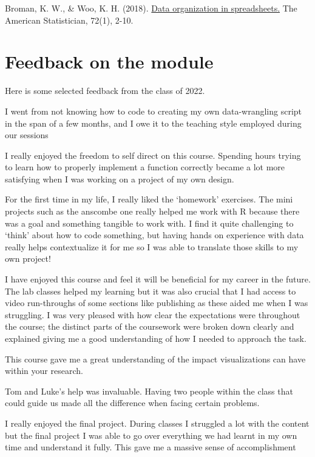 \documentclass[
]{book}
\begin{document}
Broman, K. W., \& Woo, K. H. (2018). \href{https://kbroman.org/dataorg/}{Data organization in spreadsheets.} The American Statistician, 72(1), 2-10.

\hspace{0pt}

\hypertarget{feedback-on-the-module}{%
\section{Feedback on the module}\label{feedback-on-the-module}}

Here is some selected feedback from the class of 2022.

I went from not knowing how to code to creating my own data-wrangling script in the span of a few months, and I owe it to the teaching style employed during our sessions

I really enjoyed the freedom to self direct on this course. Spending hours trying to learn how to properly implement a function correctly became a lot more satisfying when I was working on a project of my own design.

For the first time in my life, I really liked the `homework' exercises. The mini projects such as the anscombe one really helped me work with R because there was a goal and something tangible to work with. I find it quite challenging to `think' about how to code something, but having hands on experience with data really helps contextualize it for me so I was able to translate those skills to my own project!

I have enjoyed this course and feel it will be beneficial for my career in the future. The lab classes helped my learning but it was also crucial that I had access to video run-throughs of some sections like publishing as these aided me when I was struggling. I was very pleased with how clear the expectations were throughout the course; the distinct parts of the coursework were broken down clearly and explained giving me a good understanding of how I needed to approach the task.

This course gave me a great understanding of the impact visualizations can have within your research.

Tom and Luke's help was invaluable. Having two people within the class that could guide us made all the difference when facing certain problems.

I really enjoyed the final project. During classes I struggled a lot with the content but the final project I was able to go over everything we had learnt in my own time and understand it fully. This gave me a massive sense of accomplishment
\end{document}
